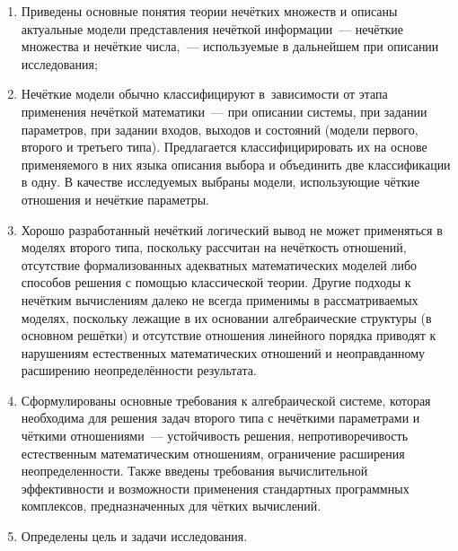 \begin{enumerate}
  \item Приведены основные понятия теории нечётких множеств и описаны актуальные модели представления нечёткой информации~--- нечёткие множества и нечёткие числа,~--- используемые в дальнейшем при описании исследования;
  \item Нечёткие модели обычно классифицируют в~зависимости от этапа применения нечёткой математики~--- при описании системы, при задании параметров, при задании входов, выходов и состояний (модели первого, второго и третьего типа). Предлагается классифицирировать их на основе применяемого в них языка описания выбора и объединить две классификации в одну. В качестве исследуемых выбраны модели, использующие чёткие отношения и нечёткие параметры.
  \item Хорошо разработанный нечёткий логический вывод не может применяться в моделях второго типа, поскольку рассчитан на нечёткость отношений, отсутствие формализованных адекватных математических моделей либо способов решения с помощью классической теории. Другие подходы к нечётким вычислениям далеко не всегда применимы в рассматриваемых моделях, поскольку лежащие в их основании алгебраические структуры (в основном решётки) и отсутствие отношения линейного порядка приводят к нарушениям естественных математических отношений и неоправданному расширению неопределённости результата.
  \item Сформулированы основные требования к алгебраической системе, которая необходима для решения задач второго типа с нечёткими параметрами и чёткими отношениями~--- устойчивость решения, непротиворечивость естественным математическим отношениям, ограничение расширения неопределенности. Также введены требования вычислительной эффективности и возможности применения стандартных программных комплексов, предназначенных для чётких вычислений.
  \item Определены цель и задачи исследования.
\end{enumerate}
